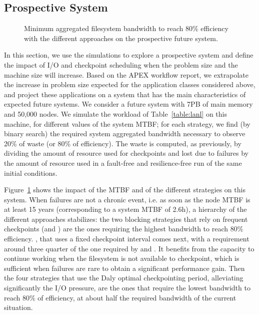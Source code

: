 \subsection{Prospective System}

\begin{figure}
  \begin{center}
    \resizebox{\linewidth}{!}{}
  \end{center}
  \caption{Minimum aggregated filesystem bandwidth to reach 80\%
    efficiency with the different approaches on the prospective
    future system.\label{fig:prosp}}
\end{figure}

In this section, we use the simulations to explore a prospective
system and define the impact of I/O and checkpoint scheduling when the
problem size and the machine size will increase. Based on the APEX
workflow report, we extrapolate the increase in problem size expected
for the application classes considered above,
and project these applications on a system that has the main
characteristics of expected future systems. We consider a future system with
7PB of main memory and 50,000 nodes. We simulate the workload of
Table~\ref{table:lanl} on this machine, 
for different values of the
system MTBF; for each strategy, we find (by binary search) the
required system aggregated bandwidth necessary to observe 20\% of
waste (or 80\% of efficiency). The waste is computed, as previously,
by dividing the amount of resource used for checkpoints and lost due
to failures by the amount of resource used in a fault-free and
resilience-free run of the same initial conditions.

Figure~\ref{fig:prosp} shows the impact of the MTBF and of the
different strategies on this system. When failures are not a chronic
event, i.e. as soon as the node MTBF is at least 15 years
(corresponding to a system MTBF of 2.6h), a hierarchy of the different
approaches stabilizes: the two blocking strategies that rely on
frequent checkpoints (\propfixed and \bfifofixed) are the ones
requiring the highest bandwidth to reach 80\%
efficiency. %
\fifofixed, that uses a fixed checkpoint interval comes next, with a
requirement around three quarter of the one required by \propfixed and
\fifofixed. It benefits from the capacity to continue working when the
filesystem is not available to checkpoint, which is sufficient when
failures are rare to obtain a significant performance
gain. %
Then the four strategies that use the Daly optimal checkpointing
period, alleviating significantly the I/O pressure, are the ones that
require the lowest bandwidth to reach 80\% of efficiency, at about
half the required bandwidth of the current
situation. %

